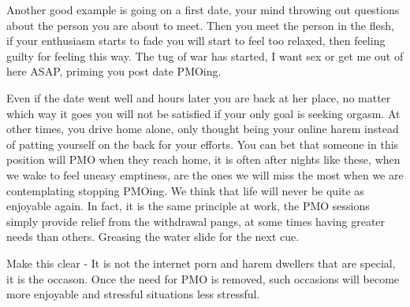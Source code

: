 \documentclass[easypeasy.tex]{subfiles}
\begin{document}
Another good example is going on a first date, your mind throwing out questions about the person you are about to meet. Then you meet the person in the flesh, if your enthusiasm starts to fade you will start to feel too relaxed, then feeling guilty for feeling this way. The tug of war has started, I want sex or get me out of here ASAP, priming you post date PMOing.

Even if the date went well and hours later you are back at her place, no matter which way it goes you will not be satisfied if your only goal is seeking orgasm. At other times, you drive home alone, only thought being your online harem instead of patting yourself on the back for your efforts. You can bet that someone in this position will PMO when they reach home, it is often after nights like these, when we wake to feel uneasy emptiness, are the ones we will miss the most when we are contemplating stopping PMOing. We think that life will never be quite as enjoyable again. In fact, it is the same principle at work, the PMO sessions simply provide relief from the withdrawal pangs, at some times having greater needs than others. Greasing the water slide for the next cue.

Make this clear - It is not the internet porn and harem dwellers that are special, it is the occason. Once the need for PMO is removed, such occasions will become more enjoyable and stressful situations less stressful.
\end{document}
